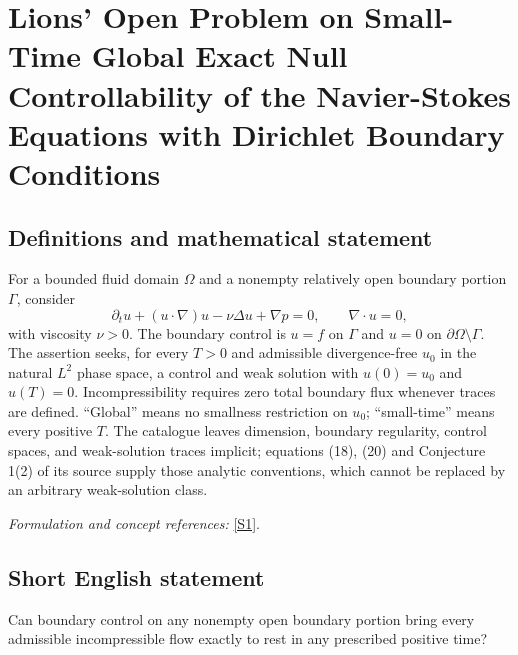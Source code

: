 \documentclass[11pt]{article}
\begin{document}
\section*{\texorpdfstring{Lions' Open Problem on Small-Time Global Exact Null Controllability of the Navier-Stokes Equations with Dirichlet Boundary Conditions}{Lions' Open Problem on Small-Time Global Exact Null Controllability of the Navier-Stokes Equations with Dirichlet Boundary Conditions}}\label{statement}
\subsection{Definitions and mathematical statement}
For a bounded fluid domain $\Omega$ and a nonempty relatively open boundary portion $\Gamma$, consider
\[
 \partial_tu+(u\cdot\nabla)u-\nu\Delta u+\nabla p=0,
 \qquad\nabla\cdot u=0,
\]
with viscosity $\nu>0$. The boundary control is $u=f$ on $\Gamma$ and $u=0$ on $\partial\Omega\setminus\Gamma$. The assertion seeks, for every $T>0$ and admissible divergence-free $u_0$ in the natural $L^2$ phase space, a control and weak solution with $u(0)=u_0$ and $u(T)=0$. Incompressibility requires zero total boundary flux whenever traces are defined. ``Global'' means no smallness restriction on $u_0$; ``small-time'' means every positive $T$. The catalogue leaves dimension, boundary regularity, control spaces, and weak-solution traces implicit; equations (18), (20) and Conjecture 1(2) of its source supply those analytic conventions, which cannot be replaced by an arbitrary weak-solution class.
\par\smallskip\textit{Formulation and concept references:} \href{https://link.springer.com/article/10.1007/s40324-024-00363-7}{[S1]}.

\subsection{Short English statement}
Can boundary control on any nonempty open boundary portion bring every admissible incompressible flow exactly to rest in any prescribed positive time?
\end{document}
